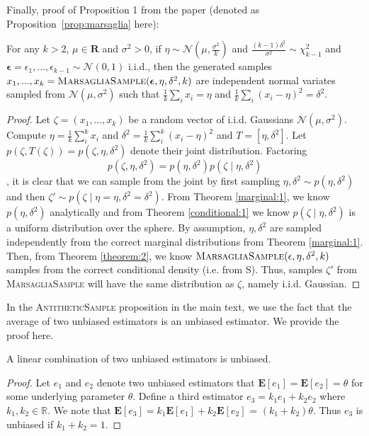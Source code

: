 Finally, proof of Proposition 1 from the paper (denoted as Proposition~\ref{prop:marsaglia} here):
\begin{prop}
    For any $k>2$, $\mu \in \mathbf{R}$ and $\sigma^2>0$, if $\eta \sim \mathcal{N}(\mu, \frac{\sigma^2}{k})$ and $\frac{(k-1)\delta^2}{\sigma^2} \sim \chi^2_{k-1}$ and $\boldsymbol{\epsilon} = \epsilon_1, ..., \epsilon_{k-1} \sim \mathcal{N}(0, 1)$ i.i.d., then the generated samples $x_1, ..., x_k = \textsc{MarsagliaSample}(\boldsymbol{\epsilon}, \eta, \delta^2,k)$ are independent normal variates sampled from $\mathcal{N}(\mu, \sigma^2)$ such that $\frac{1}{k}\sum_i x_i = \eta$ and $\frac{1}{k}\sum_i(x_i - \eta)^2 = \delta^2$.
    \label{prop:marsaglia}
\end{prop}
\begin{proof}
Let  $\zeta=(x_1, ..., x_k)$  be a random vector of i.i.d. Gaussians $\mathcal{N}(\mu, \sigma^2)$. Compute $\eta=\frac{1}{k}\sum_i^k x_i$ and $\delta^2 = \frac{1}{k}\sum_i^k (x_i - \eta)^2$ and $T  = [\eta, \delta^2]$. Let $p(\zeta, T(\zeta)) = p(\zeta, \eta,\delta^2)$ denote their joint distribution.  Factoring
\[
p(\zeta, \eta, \delta^2) = p(\eta,\delta^2) p(\zeta \mid \eta, \delta^2)
\],
it is clear that we can sample from the joint by first sampling $\eta,\delta^2 \sim p(\eta, \delta^2)$ and then $\zeta' \sim p(\zeta \mid \eta=\eta,\delta^2=\delta^2)$. From Theorem \ref{marginal:1}, we know $p(\eta, \delta^2)$ analytically and from Theorem \ref{conditional:1} we know $p(\zeta \mid \eta,\delta^2)$ is a uniform distribution over the sphere. By assumption, $\eta,\delta^2$ are sampled independently from the correct marginal distributions from Theorem \ref{marginal:1}. Then, from Theorem \ref{theorem:2}, we know $\textsc{MarsagliaSample}(\epsilon, \eta, \delta^2, k)$ samples from the correct conditional density (i.e. from S). Thus, samples $\zeta'$ from \textsc{MarsagliaSample} will have the same distribution as $\zeta$, namely i.i.d. Gaussian.
\end{proof}

In the \textsc{AntitheticSample} proposition in the main text, we use the fact that the average of two unbiased estimators is an unbiased estimator. We provide the proof here.

\begin{lem} A linear combination of two unbiased estimators is unbiased.
\label{lemma:sum}
\end{lem}
\begin{proof} Let $e_1$ and $e_2$ denote two unbiased estimators that $\mathbf{E}[e_1] = \mathbf{E}[e_2] = \theta$ for some underlying parameter $\theta$. Define a third estimator $e_3 = k_1e_1 + k_2e_2$ where $k_1, k_2 \in \mathbb{R}$. We note that $\mathbf{E}[e_3] = k_1\mathbf{E}[e_1] + k_2\mathbf{E}[e_2]$ = $(k_1 + k_2)\theta$. Thus $e_3$ is unbiased if $k_1 + k_2 = 1$.
\end{proof}

